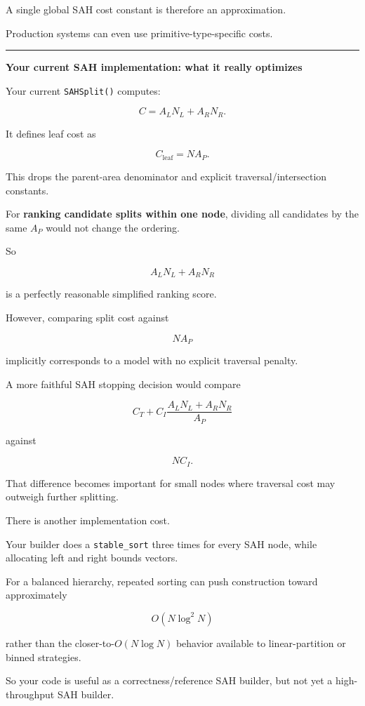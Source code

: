 A single global SAH cost constant is therefore an approximation.

Production systems can even use primitive-type-specific costs.

\begin{center}\rule{0.5\linewidth}{0.5pt}\end{center}

\textbf{Your current SAH implementation: what it really optimizes}

Your current \texttt{SAHSplit()} computes:

\[
C=
A_LN_L+A_RN_R.
\]

It defines leaf cost as

\[
C_{\text{leaf}}
=
NA_P.
\]

This drops the parent-area denominator and explicit traversal/intersection constants.

For \textbf{ranking candidate splits within one node}, dividing all candidates by the same \(A_P\) would not change the ordering.

So

\[
A_LN_L+A_RN_R
\]

is a perfectly reasonable simplified ranking score.

However, comparing split cost against

\[
NA_P
\]

implicitly corresponds to a model with no explicit traversal penalty.

A more faithful SAH stopping decision would compare

\[
C_T+
C_I\frac{A_LN_L+A_RN_R}{A_P}
\]

against

\[
NC_I.
\]

That difference becomes important for small nodes where traversal cost may outweigh further splitting.

There is another implementation cost.

Your builder does a \texttt{stable\_sort} three times for every SAH node, while allocating left and right bounds vectors.

For a balanced hierarchy, repeated sorting can push construction toward approximately

\[
O(N\log^2 N)
\]

rather than the closer-to-\(O(N\log N)\) behavior available to linear-partition or binned strategies.

So your code is useful as a correctness/reference SAH builder, but not yet a high-throughput SAH builder.

